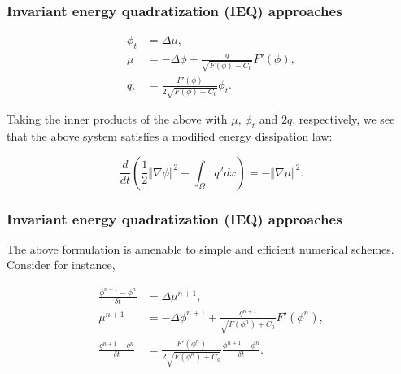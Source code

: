 \documentclass{beamer}
\begin{document}
    \begin{frame}
    \frametitle{Invariant energy quadratization (IEQ) approaches}

\begin{equation}\label{IEQ}
  \begin{split}
\phi_t&=\Delta\mu,\\
\mu&=-\Delta\phi+\frac{q}{\sqrt{F(\phi)+C_0}}F'(\phi),\\
q_t&=\frac{F'(\phi)}{2\sqrt{F(\phi)+C_0}}\phi_t.
  \end{split}
\end{equation}

Taking the inner products of the above with $\mu$, $\phi_t$ and $2q$, respectively, we see that the above system satisfies a modified energy dissipation law:

$$
\frac{d}{dt}(\frac{1}{2}\Vert\nabla\phi\Vert^2+\int_{\Omega}q^2 dx)=-\Vert\nabla\mu\Vert^2.
$$

    \end{frame}
    \begin{frame}
    \frametitle{Invariant energy quadratization (IEQ) approaches}

The above formulation is amenable to simple and efficient numerical schemes. Consider for instance,

\begin{equation}\label{DisIEQ}
  \begin{split}
\frac{\phi^{n+1}-\phi^{n}}{\delta t}&=\Delta\mu^{n+1},\\
\mu^{n+1}&=-\Delta\phi^{n+1}+\frac{q^{n+1}}{\sqrt{F(\phi^n)+C_0}}F'(\phi^n),\\
\frac{q^{n+1}-q^n}{\delta t}&=\frac{F'(\phi^n)}{2\sqrt{F(\phi^n)+C_0}}\frac{\phi^{n+1}-\phi^{n}}{\delta t}.
  \end{split}
\end{equation}

    \end{frame}
\end{document}
